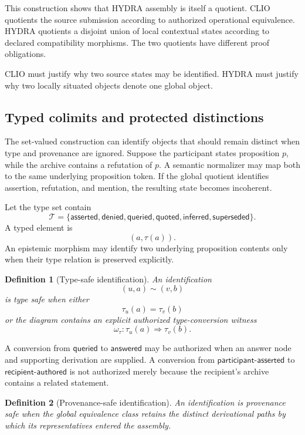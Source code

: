 \documentclass[11pt]{article}
\newtheorem{definition}{Definition}[section]
\theoremstyle{definition}
\begin{document}
This construction shows that HYDRA assembly is itself a quotient. CLIO quotients the source submission according to authorized operational equivalence. HYDRA quotients a disjoint union of local contextual states according to declared compatibility morphisms. The two quotients have different proof obligations.

CLIO must justify why two source states may be identified. HYDRA must justify why two locally situated objects denote one global object.

\subsection{Typed colimits and protected distinctions}

The set-valued construction can identify objects that should remain distinct when type and provenance are ignored. Suppose the participant states proposition \(p\), while the archive contains a refutation of \(p\). A semantic normalizer may map both to the same underlying proposition token. If the global quotient identifies assertion, refutation, and mention, the resulting state becomes incoherent.

Let the type set contain
\[
\mathcal T
=
\{
\mathsf{asserted},
\mathsf{denied},
\mathsf{queried},
\mathsf{quoted},
\mathsf{inferred},
\mathsf{superseded}
\}.
\]
A typed element is
\[
(a,\tau(a)).
\]
An epistemic morphism may identify two underlying proposition contents only when their type relation is preserved explicitly.

\begin{definition}[Type-safe identification]
An identification
\[
(u,a)\sim(v,b)
\]
is type safe when either
\[
\tau_u(a)=\tau_v(b)
\]
or the diagram contains an explicit authorized type-conversion witness
\[
\omega_{\tau}:
\tau_u(a)\Rightarrow\tau_v(b).
\]
\end{definition}

A conversion from \(\mathsf{queried}\) to \(\mathsf{answered}\) may be authorized when an answer node and supporting derivation are supplied. A conversion from \(\mathsf{participant\text{-}asserted}\) to \(\mathsf{recipient\text{-}authored}\) is not authorized merely because the recipient's archive contains a related statement.

\begin{definition}[Provenance-safe identification]
An identification is provenance safe when the global equivalence class retains the distinct derivational paths by which its representatives entered the assembly.
\end{definition}
\end{document}
